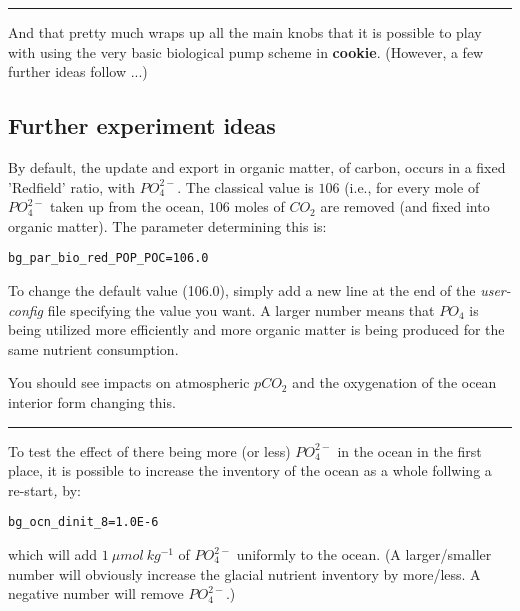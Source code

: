 \vspace{1mm} \noindent\rule{4cm}{0.5pt} \vspace{2mm}

\noindent And that pretty much wraps up all the main knobs that it is possible to play with using the very basic biological pump scheme in \textbf{cookie}. (However, a few further ideas follow ...)

\newpage

\subsection{Further experiment ideas}

\noindent By default, the update and export in organic matter, of carbon, occurs in a fixed 'Redfield' ratio, with \(PO^{2-}_{4}\). The classical value is \(106\) (i.e., for every mole of \(PO^{2-}_{4}\) taken up from the ocean, \(106\) moles of \(CO_{2}\) are removed (and fixed into organic matter). The parameter determining this is:
\vspace{-2mm}\small\begin{verbatim}
bg_par_bio_red_POP_POC=106.0
\end{verbatim}\normalsize\vspace{-2mm}
To change the default value (106.0), simply add a new line at the end of the \textit{user-config} file specifying the value you want. A larger number means that \(PO_{4}\) is being utilized more efficiently and more organic matter is being produced for the same nutrient consumption.

You should see impacts on atmospheric \(pCO_{2}\) and the oxygenation of the ocean interior form changing this.

\vspace{1mm} \noindent\rule{4cm}{0.5pt} \vspace{2mm}

\noindent To test the effect of there being more (or less) \(PO^{2-}_{4}\) in the ocean in the first place, it is possible to increase the inventory of the ocean as a whole follwing a re-start\textit{, }by:
\vspace{-2mm}\small\begin{verbatim}
bg_ocn_dinit_8=1.0E-6
\end{verbatim}\normalsize\vspace{-2mm}
which will add \(1\:\mu mol\:kg^{-1}\) of \(PO^{2-}_{4}\) uniformly to the ocean. (A larger/smaller number will obviously increase the glacial nutrient inventory by more/less. A negative number will remove \(PO^{2-}_{4}\).)

